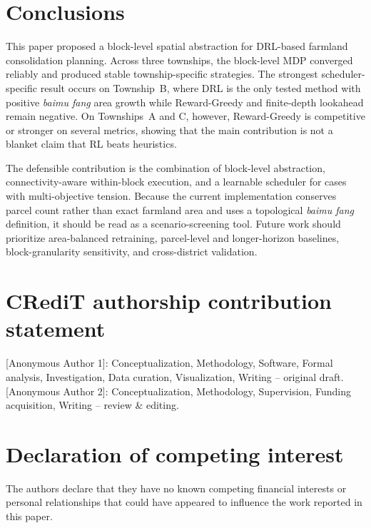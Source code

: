 \documentclass[preprint,12pt]{elsarticle}
\begin{document}
\section{Conclusions}
\label{sec:conclusions}

This paper proposed a block-level spatial abstraction for DRL-based farmland consolidation planning. Across three townships, the block-level MDP converged reliably and produced stable township-specific strategies. The strongest scheduler-specific result occurs on Township~B, where DRL is the only tested method with positive \textit{baimu fang} area growth while Reward-Greedy and finite-depth lookahead remain negative. On Townships~A and C, however, Reward-Greedy is competitive or stronger on several metrics, showing that the main contribution is not a blanket claim that RL beats heuristics.

The defensible contribution is the combination of block-level abstraction, connectivity-aware within-block execution, and a learnable scheduler for cases with multi-objective tension. Because the current implementation conserves parcel count rather than exact farmland area and uses a topological \textit{baimu fang} definition, it should be read as a scenario-screening tool. Future work should prioritize area-balanced retraining, parcel-level and longer-horizon baselines, block-granularity sensitivity, and cross-district validation.



\section*{CRediT authorship contribution statement}
[Anonymous Author 1]: Conceptualization, Methodology, Software, Formal analysis, Investigation, Data curation, Visualization, Writing -- original draft.
[Anonymous Author 2]: Conceptualization, Methodology, Supervision, Funding acquisition, Writing -- review \& editing.

\section*{Declaration of competing interest}
The authors declare that they have no known competing financial interests or personal relationships that could have appeared to influence the work reported in this paper.
\end{document}
